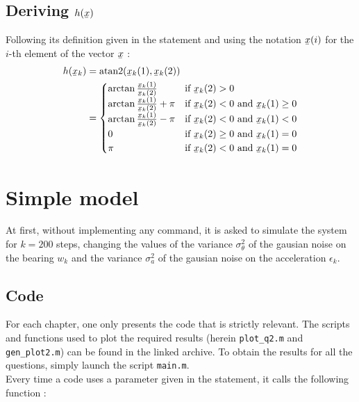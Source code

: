 \documentclass[english,DIV=13]{scrreprt}
\newcommand{\ubar}[1]{\underaccent{\bar}{#1}}
\newcommand{\uvec}[1]{\ubar{#1}}
\begin{document}
\section*{Deriving $h(\ubar{x})$}
Following its definition given in the statement and using the notation $\uvec{x}(i)$
for the $i$-th element of the vector $\uvec{x}$ :
\begin{align*}
    h(\uvec{x}_k) &= \mathrm{atan2}(\uvec{x}_k(1), \uvec{x}_k(2)) \\
    &= \begin{cases}
        \arctan\frac{\uvec{x}_k(1)}{\uvec{x}_k(2)} & \text{if $\uvec{x}_k(2) > 0$} \\
        \arctan\frac{\uvec{x}_k(1)}{\uvec{x}_k(2)}+\pi & \text{if $\uvec{x}_k(2) < 0$ and $\uvec{x}_k(1) \geq 0$} \\
        \arctan\frac{\uvec{x}_k(1)}{\uvec{x}_k(2)}-\pi & \text{if $\uvec{x}_k(2) < 0$ and $\uvec{x}_k(1) < 0$} \\
        0 & \text{if $\uvec{x}_k(2) \geq 0$ and $\uvec{x}_k(1) = 0$} \\
        \pi & \text{if $\uvec{x}_k(2) < 0$ and $\uvec{x}_k(1) = 0$}
    \end{cases}
\end{align*}

\chapter{Simple model}
At first, without implementing any command, it is asked to simulate the system for $k=200$ steps, changing
the values of the variance $\sigma^2_{\theta}$ of the gausian noise on the bearing $w_k$  and
the variance  $\sigma^2_a$ of the gausian noise on the acceleration $\epsilon_k$.

\section*{Code}
For each chapter, one only presents the code that is strictly relevant. The scripts and functions 
used to plot the required results (herein \texttt{plot\_q2.m} and \texttt{gen\_plot2.m})
can be found in the linked archive. To obtain the results for all the questions, simply launch
the script \texttt{main.m}.\\



Every time a code uses a parameter given in the statement, it calls the following function : 

\end{document}
